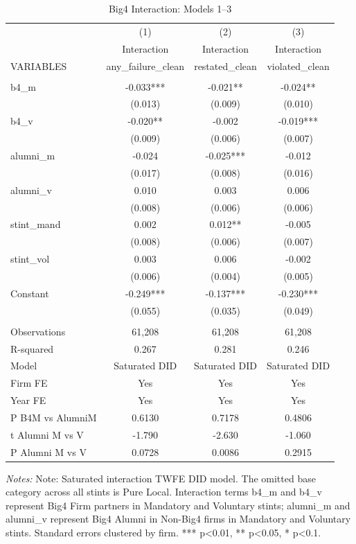 \begin{table}[htbp]
\footnotesize
\centering
\caption{Big4 Interaction: Models 1--3}
\begin{threeparttable}
\begin{tabular}{p{}ccc}
\toprule
 & (1) & (2) & (3) \\
 & Interaction & Interaction & Interaction \\
VARIABLES & any\_failure\_clean & restated\_clean & violated\_clean \\
\midrule
 &  &  &  \\
b4\_m & -0.033*** & -0.021** & -0.024** \\
 & (0.013) & (0.009) & (0.010) \\
b4\_v & -0.020** & -0.002 & -0.019*** \\
 & (0.009) & (0.006) & (0.007) \\
alumni\_m & -0.024 & -0.025*** & -0.012 \\
 & (0.017) & (0.008) & (0.016) \\
alumni\_v & 0.010 & 0.003 & 0.006 \\
 & (0.008) & (0.006) & (0.006) \\
stint\_mand & 0.002 & 0.012** & -0.005 \\
 & (0.008) & (0.006) & (0.007) \\
stint\_vol & 0.003 & 0.006 & -0.002 \\
 & (0.006) & (0.004) & (0.005) \\
Constant & -0.249*** & -0.137*** & -0.230*** \\
 & (0.055) & (0.035) & (0.049) \\
 &  &  &  \\
Observations & 61,208 & 61,208 & 61,208 \\
R-squared & 0.267 & 0.281 & 0.246 \\
Model & Saturated DID & Saturated DID & Saturated DID \\
Firm FE & Yes & Yes & Yes \\
Year FE & Yes & Yes & Yes \\
P B4M vs AlumniM & 0.6130 & 0.7178 & 0.4806 \\
t Alumni M vs V & -1.790 & -2.630 & -1.060 \\
P Alumni M vs V & 0.0728 & 0.0086 & 0.2915 \\
\bottomrule
\end{tabular}
\begin{tablenotes}\footnotesize
\item \raggedright \textit{Notes:} Note: Saturated interaction TWFE DID model. The omitted base category across all stints is Pure Local. Interaction terms b4\_m and b4\_v represent Big4 Firm partners in Mandatory and Voluntary stints; alumni\_m and alumni\_v represent Big4 Alumni in Non-Big4 firms in Mandatory and Voluntary stints. Standard errors clustered by firm. *** p<0.01, ** p<0.05, * p<0.1.
\end{tablenotes}
\end{threeparttable}
\end{table}
